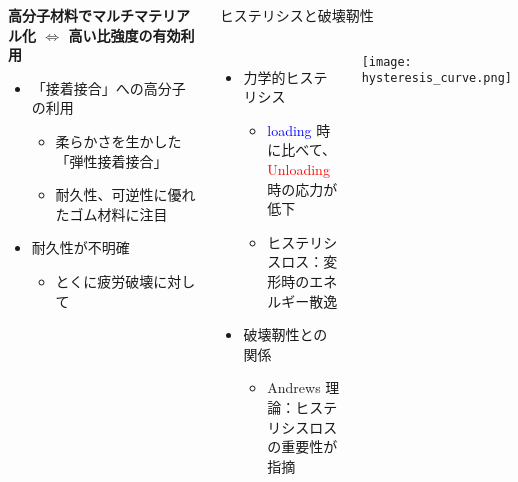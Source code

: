 \begin{columns}[totalwidth=.85\linewidth]
	\column{\textwidth}
	\vspace{-10mm}
		\begin{boxnote}
			\textbf{高分子材料でマルチマテリアル化 $\Leftrightarrow$ 高い比強度の有効利用}
			\begin{itemize}
				\item {\color{red} 「接着接合」}への高分子の利用
					\begin{itemize}
						\normalsize
						\item 柔らかさを生かした{\color{red} 「弾性接着接合」}
						\item 耐久性、可逆性に優れた\alert{ゴム材料に注目}
					\end{itemize}
				\item {\color{blue}耐久性が不明確}
					\begin{itemize}
						\normalsize
						\item とくに疲労破壊に対して
					\end{itemize}
			\end{itemize}
		\end{boxnote}

		\begin{itembox}[l]{ヒステリシスと破壊靭性}
			\begin{columns}[totalwidth=\linewidth]
					\begin{itemize}
						\item 力学的ヒステリシス
						\begin{itemize}
							\normalsize
							\item
							\textcolor{blue}{loading} 時に比べて、\textcolor{red}{Unloading} 時の応力が低下
							\item
							ヒステリシスロス：変形時のエネルギー散逸
						\end{itemize}
						\item 破壊靭性との関係
						\begin{itemize}
							\normalsize
							\item
							Andrews 理論：ヒステリシスロスの重要性が指摘
						\end{itemize}
					\end{itemize}
					\centering
					\texttt{[image: hysteresis\_curve.png]}
				\end{columns}
		\end{itembox}


\end{columns}
